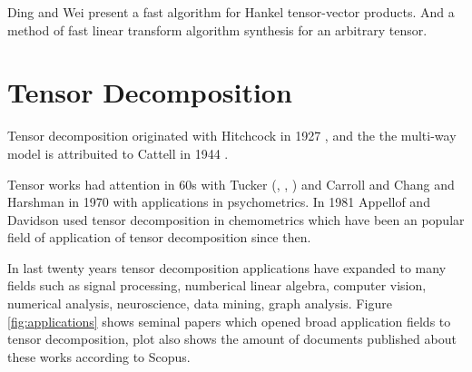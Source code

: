 \documentclass[letterpaper,12pt]{article}
\begin{document}








Ding and Wei \cite{Ding2015} present a fast algorithm for Hankel tensor-vector products. And \cite{Dourbal2016} a method of fast linear transform algorithm synthesis for an arbitrary tensor.

\section{Tensor Decomposition}


Tensor decomposition originated with Hitchcock in 1927 \cite{Hitchcock1927}, and the the multi-way model is attribuited to Cattell in 1944 \cite{Cattell1944}.

Tensor works had attention in 60s with Tucker (\cite{Tucker1963}, \cite{Tucker1964}, \cite{Tucker1966}) and Carroll and Chang \cite{Carroll1970} and Harshman in 1970 \cite{Harshman1970} with applications in psychometrics. In 1981 Appellof and Davidson \cite{Appellof1981} used tensor decomposition in chemometrics which have been an popular field of application of tensor decomposition since then.

In last twenty years tensor decomposition applications have expanded to many fields such as signal processing, numberical linear algebra, computer vision, numerical analysis, neuroscience, data mining, graph analysis. Figure \ref{fig:applications} shows seminal papers which opened broad application fields to tensor decomposition, plot also shows the amount of documents published about these works according to Scopus.
\end{document}
